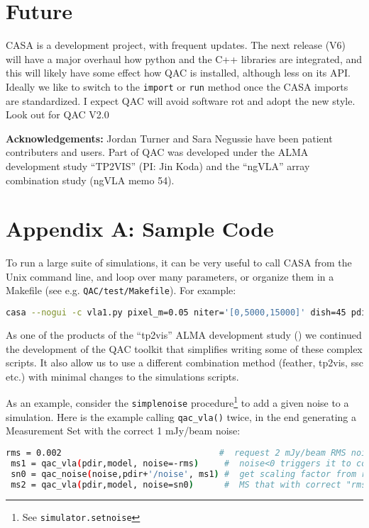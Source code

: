 \documentclass[12pt,a4paper]{article}
\begin{document}
\section{Future}

CASA is a development project, with frequent updates.
The next release (V6) will have a major overhaul how python and the C++ libraries
are integrated, and this will likely have some effect how QAC is installed, although less on its API. Ideally
we like to switch to the {\tt import} or {\tt run} method once the CASA imports are standardized.  I expect
QAC will avoid software rot and adopt the new style. Look out for QAC V2.0 

\bigskip
\noindent
{\bf Acknowledgements:} Jordan Turner and Sara Negussie have been patient contributers and users.
Part of QAC was developed under the ALMA development study ``TP2VIS''  (PI: Jin Koda) and
the ``ngVLA'' array combination study (ngVLA memo 54).




\newpage
\section*{Appendix A: Sample Code}

To run a large suite of simulations, it can be very useful to call CASA from the Unix command line,
and loop over many parameters, or organize them in a Makefile (see e.g. {\tt QAC/test/Makefile}).
For example:

\begin{lstlisting}[language=bash]
  casa --nogui -c vla1.py pixel_m=0.05 niter='[0,5000,15000]' dish=45 pdir='"exp102"'
\end{lstlisting}

As one of the products of the ``tp2vis'' ALMA development study (\cite{tp2vis})
we continued the development of the
QAC toolkit that simplifies writing some of these complex scripts. It also allow us
to use a different combination
method (feather, tp2vis, ssc etc.) with minimal changes to the simulations scripts.

As an example, consider the {\tt simplenoise} procedure\footnote{See {\tt simulator.setnoise}}
to add a given noise to a simulation.
Here is the example calling {\tt qac\_vla()} twice, in the end generating a Measurement Set with
the correct 1 mJy/beam noise:

\begin{lstlisting}[language=bash]
 rms = 0.002                               #  request 2 mJy/beam RMS noise (NA)
 ms1 = qac_vla(pdir,model, noise=-rms)     #  noise<0 triggers it to compute the rms
 sn0 = qac_noise(noise,pdir+'/noise', ms1) #  get scaling factor from rms in ms1
 ms2 = qac_vla(pdir,model, noise=sn0)      #  MS that with correct "rms" in Jy/beam
\end{lstlisting}
\end{document}
